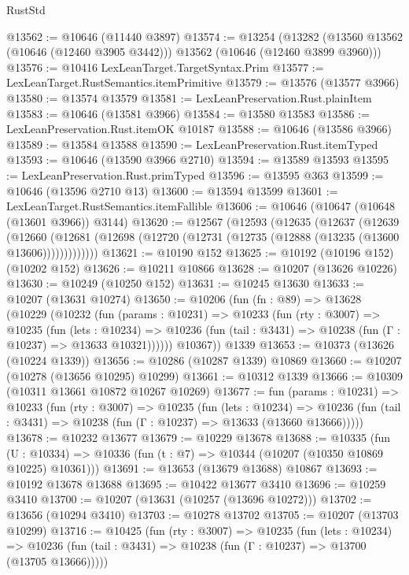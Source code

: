 \begin{lexlean}{RustStd}
\begin{coremodule}
@13562 := @10646 (@11440 @3897)
@13574 := @13254
    (@13282 (@13560 @13562 (@10646 (@12460 @3905 @3442))) @13562 (@10646 (@12460 @3899 @3960)))
@13576 := @10416 LexLeanTarget.TargetSyntax.Prim
@13577 := LexLeanTarget.RustSemantics.itemPrimitive
@13579 := @13576 (@13577 @3966)
@13580 := @13574 @13579
@13581 := LexLeanPreservation.Rust.plainItem
@13583 := @10646 (@13581 @3966)
@13584 := @13580 @13583
@13586 := LexLeanPreservation.Rust.itemOK @10187
@13588 := @10646 (@13586 @3966)
@13589 := @13584 @13588
@13590 := LexLeanPreservation.Rust.itemTyped
@13593 := @10646 (@13590 @3966 @2710)
@13594 := @13589 @13593
@13595 := LexLeanPreservation.Rust.primTyped
@13596 := @13595 @363
@13599 := @10646 (@13596 @2710 @13)
@13600 := @13594 @13599
@13601 := LexLeanTarget.RustSemantics.itemFallible
@13606 := @10646 (@10647 (@10648 (@13601 @3966)) @3144)
@13620 := @12567
    (@12593
      (@12635
        (@12637
          (@12639
            (@12660
              (@12681 (@12698 (@12720 (@12731 (@12735 (@12888 (@13235 (@13600 @13606)))))))))))))
@13621 := @10190 @152
@13625 := @10192 (@10196 @152) (@10202 @152)
@13626 := @10211 @10866
@13628 := @10207 (@13626 @10226)
@13630 := @10249 (@10250 @152)
@13631 := @10245 @13630
@13633 := @10207 (@13631 @10274)
@13650 := @10206
    (fun (fn : @89) =>
    @13628
      (@10229
        (@10232
          (fun (params : @10231) =>
          @10233
            (fun (rty : @3007) =>
            @10235
              (fun (lets : @10234) =>
              @10236 (fun (tail : @3431) => @10238 (fun (Γ : @10237) => @13633 @10321))))))
        @10367))
    @1339
@13653 := @10373 (@13626 (@10224 @1339))
@13656 := @10286 (@10287 @1339) @10869
@13660 := @10207 (@10278 (@13656 @10295) @10299)
@13661 := @10312 @1339
@13666 := @10309 (@10311 @13661 @10872 @10267 @10269)
@13677 := fun (params : @10231) =>
  @10233
    (fun (rty : @3007) =>
    @10235
      (fun (lets : @10234) =>
      @10236 (fun (tail : @3431) => @10238 (fun (Γ : @10237) => @13633 (@13660 @13666)))))
@13678 := @10232 @13677
@13679 := @10229 @13678
@13688 := @10335
    (fun (U : @10334) => @10336 (fun (t : @7) => @10344 (@10207 (@10350 @10869 @10225) @10361)))
@13691 := @13653 (@13679 @13688) @10867
@13693 := @10192 @13678 @13688
@13695 := @10422 @13677 @3410
@13696 := @10259 @3410
@13700 := @10207 (@13631 (@10257 (@13696 @10272)))
@13702 := @13656 (@10294 @3410)
@13703 := @10278 @13702
@13705 := @10207 (@13703 @10299)
@13716 := @10425
    (fun (rty : @3007) =>
    @10235
      (fun (lets : @10234) =>
      @10236 (fun (tail : @3431) => @10238 (fun (Γ : @10237) => @13700 (@13705 @13666)))))

\end{coremodule}
\end{lexlean}
